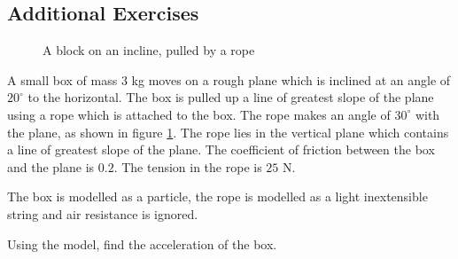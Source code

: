 \subsection{Additional Exercises}
\begin{exercise}
    \begin{figure}[H]
    \centering
    \caption{A block on an incline, pulled by a rope}
    \label{fig:block-incline-rope}
    \end{figure}
    A small box of mass $3$ kg moves on a rough plane which is inclined 
    at an angle of $20^\circ$ to the horizontal. The box is pulled up a line 
    of greatest slope of the plane using a rope which is attached 
    to the box. The rope makes an angle of $30^\circ$ with the plane, as shown in figure \ref{fig:block-incline-rope}. 
    The rope lies in the vertical plane which contains a line of greatest slope of the plane. 
    The coefficient of friction between the box and the plane is $0.2$. The tension in the rope is $25$ N.

    The box is modelled as a particle, the rope is modelled as a light inextensible string and 
    air resistance is ignored.

    Using the model, find the acceleration of the box.
\end{exercise}

